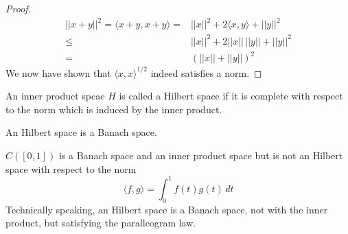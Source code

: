 \begin{proof}
\begin{align*}
||x+y||^2=\langle x+y,x+y\rangle =&||x||^2+2\langle x,y\rangle +||y||^2\\
\leq &||x||^2+2||x||\,||y||+||y||^2\\
=&(||x||+||y||)^2
\end{align*}
We now have shown that $\langle x,x\rangle ^{1/2}$ indeed satisfies a norm.
\end{proof}
\vspace{2ex}
\begin{defi}
An inner product spcae $H$ is called a Hilbert space if it is complete with respect to the norm which is induced by the inner product. 
\end{defi}
\vspace{2ex}
\begin{thm}
An Hilbert space is a Banach space. 
\end{thm}
\vspace{2ex}
\begin{ex}
$C([0,1])$ is a Banach space and an inner product space but is not an Hilbert space with respect to the norm
\[\langle f,g\rangle =\int ^{1}_{0}f(t)g(t)\,dt\]
Technically speaking, an Hilbert space is a Banach space, not with the inner product, but satisfying the paralleogram law.  
\end{ex}
\vspace{2ex}

